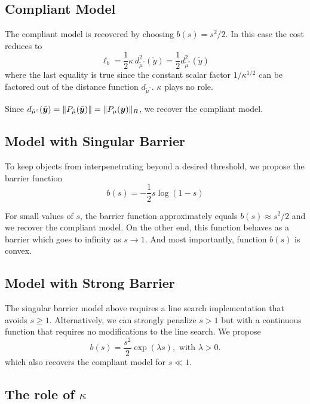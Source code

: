 \subsection{Compliant Model}

The compliant model is recovered by choosing $b(s)=s^2/2$. In this case the cost
reduces to
\begin{equation}
    \ell_b = \frac{1}{2}\kappa\,d_{\tilde{\mu}^\circ}^2(\check{y}) = 
    \frac{1}{2}d_{\tilde{\mu}^\circ}^2(\tilde{y})
\end{equation}
where the last equality is true since the constant scalar factor
$1/\kappa^{1/2}$ can be factored out of the distance function
$d_{\tilde{\mu}^\circ}$. $\kappa$ plays no role.

Since $d_{\tilde{\mu}^\circ}(\tilde{{\bm{y}}}) = \Vert
P_{\tilde\mu}(\tilde{{\bm{y}}}) \Vert = \Vert P_{\mu}({\bm{y}}) \Vert_R$, we recover
the compliant model.

\subsection{Model with Singular Barrier}

To keep objects from interpenetrating beyond a desired threshold, we propose the
barrier function
\begin{equation}
    b(s) = -\frac{1}{2}s\log(1-s)
\end{equation}

For small values of $s$, the barrier function approximately equals $b(s)\approx
s^2/2$ and we recover the compliant model. On the other end, this function
behaves as a barrier which goes to infinity as $s\rightarrow 1$. And most
importantly, function $b(s)$ is convex.

\subsection{Model with Strong Barrier}
The singular barrier model above requires a line search implementation that
avoids $s \ge 1$. Alternatively, we can strongly penalize $s>1$ but
with a continuous function that requires no modifications to the line search.
We propose
\begin{equation}
    b(s) = \frac{s^2}{2}\exp(\lambda s), \text{ with }\lambda>0.
\end{equation}
which also recovers the compliant model for $s\ll 1$.

\subsection{The role of $\kappa$}

